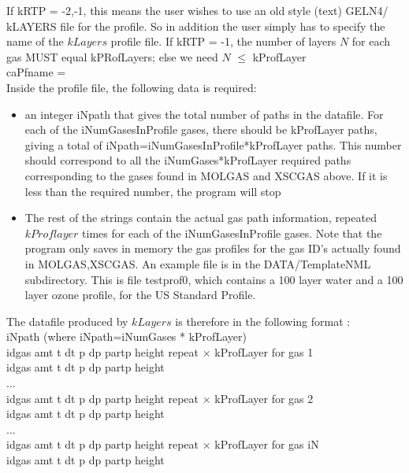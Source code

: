 \documentclass[12pt]{article}
\newcommand{\ttab}{\indent\indent}
\begin{document}
{\label{inprofile}

If kRTP = -2,-1, this means the user wishes to use an old style (text) GELN4/
kLAYERS file for the profile. So in addition the user simply has to specify 
the name  of the $kLayers$ profile file. If kRTP = -1, the number of layers $N$
for each gas MUST equal kPRofLayers; else we need $N$ $\le$ kProfLayer\\
{\sf 
\ttab caPfname = \\
}
Inside the profile file, the following data is required: \\
\begin{itemize}
\item an integer iNpath that gives the total number of paths in the datafile. 
   For each of the iNumGasesInProfile gases, there should be kProfLayer paths,
  giving a total of iNpath=iNumGasesInProfile*kProfLayer paths. This number 
  should correspond to all the iNumGases*kProfLayer required paths 
  corresponding to the gases found in MOLGAS and XSCGAS above. If it is less 
  than the required number, the program will stop
\item The rest of the  strings contain the actual gas path information, 
   repeated $kProflayer$ times for each of the iNumGasesInProfile gases.  
   Note that the program only saves in memory the gas profiles for the gas 
   ID's actually found in MOLGAS,XSCGAS. An example file is in the 
   {\sf DATA/TemplateNML} subdirectory. This is file {\sf testprof0}, which 
   contains a 100 layer water and a 100 layer ozone profile, for the US 
   Standard Profile.  
\end{itemize}

The datafile produced by $kLayers$ is therefore in the following format : \\
\medskip
{\sf 
\ttab  iNpath              (where iNpath=iNumGases * kProfLayer)\\
\ttab  idgas amt t dt p dp partp height
\hspace{0.25in} repeat $\times$ kProfLayer  for gas 1\\
\ttab  idgas amt t dt p dp partp height\\
\ttab ...\\
\ttab  idgas amt t dt p dp partp height
\hspace{0.25in} repeat $\times$ kProfLayer for gas 2\\  
\ttab  idgas amt t dt p dp partp height\\
\ttab ...\\
\ttab  idgas amt t dt p dp partp height
\hspace{0.25in} repeat $\times$ kProfLayer  for gas iN\\  
\ttab  idgas amt t dt p dp partp height\\
}

}
\end{document}
